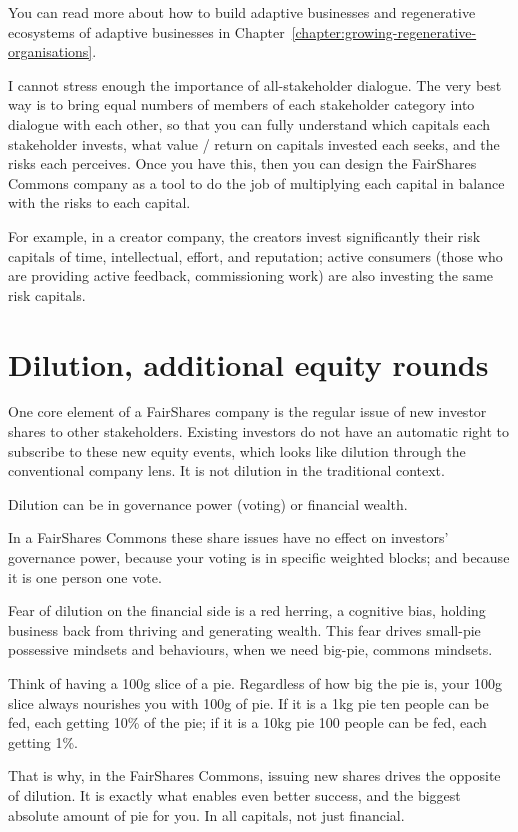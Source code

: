 You can read more about how to build adaptive businesses and regenerative ecosystems of adaptive businesses in Chapter~\ref{chapter:growing-regenerative-organisations}.


I cannot stress enough the importance of all\hyp{}stakeholder dialogue. The very best way is to bring equal numbers of members of each stakeholder category into dialogue with each other, so that you can fully understand which capitals each stakeholder invests, what value / return on capitals invested each seeks, and the risks each perceives. Once you have this, then you can design the FairShares Commons company as a tool to do the job of multiplying each capital in balance with the risks to each capital. 


For example, in a creator company, the creators invest significantly their risk capitals of  time, intellectual, effort, and reputation; active consumers (those who are providing active feedback,  commissioning work) are also investing the same risk capitals.
\section{Dilution, additional equity rounds}
One core element of a FairShares company is the regular issue of new investor shares to other stakeholders. Existing investors do not have an automatic right to subscribe to these new equity events, which looks like dilution through the conventional company lens. It is not dilution in the traditional context.


Dilution can be in governance power (voting) or financial wealth. 


In a FairShares Commons these share issues have no effect on investors’ governance power, because your voting is in specific weighted blocks; and because it is one person one vote. 


Fear of dilution on the financial side is a red herring, a cognitive bias, holding business back from thriving and generating wealth. This fear drives small-pie possessive mindsets and behaviours, when we need big-pie, commons mindsets. 


Think of having a 100g slice of a pie. Regardless of how big the pie is, your 100g slice always nourishes you with 100g of pie. If it is a 1kg pie ten people can be fed, each getting 10\% of the pie; if it is a 10kg pie 100 people can be fed, each getting 1\%. 


That is why, in the FairShares Commons, issuing new shares drives the opposite of dilution. It is exactly what enables even better success, and the biggest absolute amount of pie for you. In all capitals, not just financial. 


